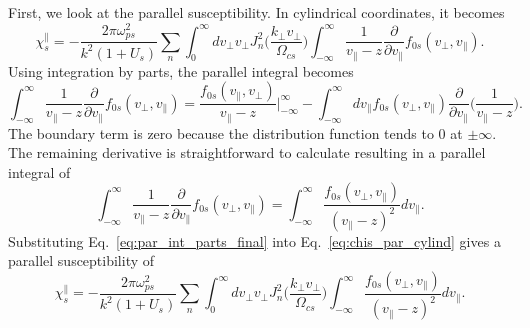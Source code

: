 First, we look at the parallel susceptibility.
In cylindrical coordinates, it becomes
\begin{equation}
	\chi_s^\parallel = -\frac{2\pi \omega_{ps}^2}{k^2 (1+U_s)} \sum_n 
	\int_0^\infty dv_\perp v_\perp J_n^2 \bigg( \frac{k_\perp v_\perp}{\Omega_{cs}}  \bigg)
	\int_{-\infty}^\infty \frac{1}{v_\parallel-z} 
	\frac{\partial}{\partial v_\parallel} f_{0s}(v_\perp, v_\parallel).
	\label{eq:chis_par_cylind}
\end{equation} 	
Using integration by parts, the parallel integral becomes
\begin{equation}
	\int_{-\infty}^\infty \frac{1}{v_\parallel-z} 
	\frac{\partial}{\partial v_\parallel} f_{0s}(v_\perp, v_\parallel) = 
	\frac{f_{0s}(v_\parallel,v_\perp)}{v_\parallel-z}\bigg|_{-\infty}^\infty
	- \int_{-\infty}^\infty dv_\parallel f_{0s}(v_\perp, v_\parallel)
	\frac{\partial}{\partial v_\parallel} \bigg( \frac{1}{v_\parallel-z}  \bigg).
	\label{eq:par_int_parts}
\end{equation}
The boundary term is zero because the distribution function tends to 0 at $\pm \infty$.
The remaining derivative is straightforward to calculate resulting in a parallel integral of 
\begin{equation}
	\int_{-\infty}^\infty \frac{1}{v_\parallel-z} 
	\frac{\partial}{\partial v_\parallel} f_{0s}(v_\perp, v_\parallel) = 
	\int_{-\infty}^\infty \frac{f_{0s}(v_\perp, v_\parallel)}{(v_\parallel-z)^2}  dv_\parallel.
	\label{eq:par_int_parts_final}
\end{equation}
Substituting Eq.~\ref{eq:par_int_parts_final} into Eq.~\ref{eq:chis_par_cylind} gives a parallel susceptibility of
\begin{equation}
	\chi_s^\parallel = -\frac{2\pi \omega_{ps}^2}{k^2 (1+U_s)} \sum_n 
	\int_0^\infty dv_\perp v_\perp J_n^2 \bigg( \frac{k_\perp v_\perp}{\Omega_{cs}}  \bigg)
	\int_{-\infty}^\infty \frac{f_{0s}(v_\perp, v_\parallel)}{(v_\parallel-z)^2} dv_\parallel.
	\label{eq:chis_par_final}
\end{equation}

